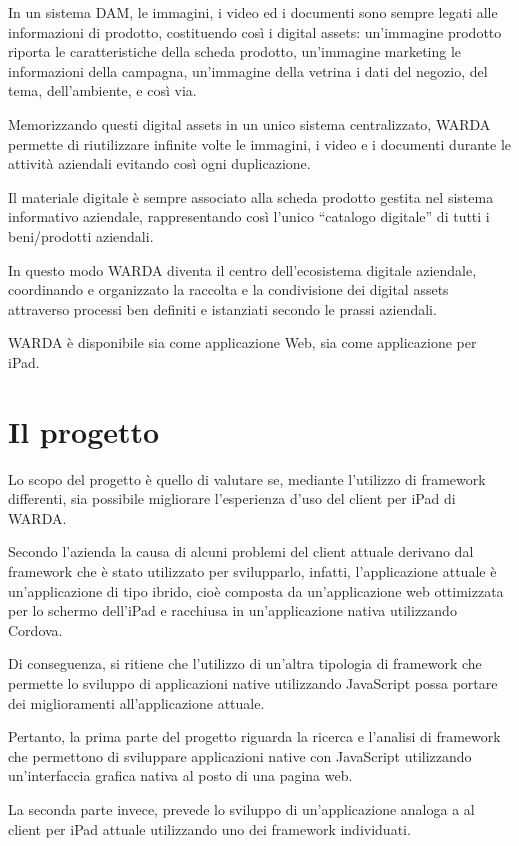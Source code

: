 In un sistema DAM, le immagini, i video ed i documenti sono sempre legati alle informazioni di prodotto, costituendo così i digital assets: un'immagine prodotto riporta le caratteristiche della scheda prodotto, un'immagine marketing le informazioni della campagna, un'immagine della vetrina i dati del negozio, del tema, dell'ambiente, e così via.

Memorizzando questi digital assets in un unico sistema centralizzato, WARDA permette di riutilizzare infinite volte le immagini, i video e i documenti durante le attività aziendali evitando così ogni duplicazione. 

Il materiale digitale è sempre associato alla scheda prodotto gestita nel sistema informativo aziendale, rappresentando così l'unico ``catalogo digitale'' di tutti i beni/prodotti aziendali.

In questo modo WARDA diventa il centro dell'ecosistema digitale aziendale, coordinando e organizzato la raccolta e la condivisione dei digital assets attraverso processi ben definiti e istanziati secondo le prassi aziendali.

WARDA è disponibile sia come applicazione Web, sia come applicazione per iPad.

\section{Il progetto}
Lo scopo del progetto è quello di valutare se, mediante l'utilizzo di framework differenti, sia possibile migliorare l'esperienza d'uso del client per iPad di WARDA.

Secondo l'azienda la causa di alcuni problemi del client attuale derivano dal framework che è stato utilizzato per svilupparlo, infatti, l'applicazione attuale è un'applicazione di tipo ibrido, cioè composta da un'applicazione web ottimizzata per lo schermo dell'iPad e racchiusa in un'applicazione nativa utilizzando Cordova.

Di conseguenza, si ritiene che l'utilizzo di un'altra tipologia di framework che permette lo sviluppo di applicazioni native utilizzando JavaScript possa portare dei miglioramenti all'applicazione attuale.

Pertanto, la prima parte del progetto riguarda la ricerca e l'analisi di framework che permettono di sviluppare applicazioni native con JavaScript utilizzando un'interfaccia grafica nativa al posto di una pagina web.

La seconda parte invece, prevede lo sviluppo di un'applicazione analoga a al client per iPad attuale utilizzando uno dei framework individuati.
